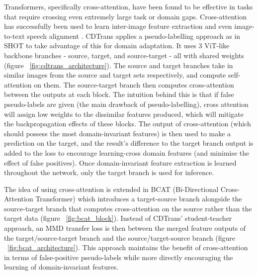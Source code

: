 \documentclass[a4paper,12pt]{report}
\begin{document}
    Transformers, specifically cross-attention, have been found to be effective in tasks that require crossing even extremely large task or domain gaps. Cross-attention has successfully been used to learn inter-image feature extraction \cite{li_trear_2021}  and even image-to-text speech alignment \cite{tsai_multimodal_2019}. CDTrans \cite{xu_cdtrans_2021} applies a pseudo-labelling approach as in SHOT \cite{liang_we_2021} to take advantage of this for domain adaptation. It uses 3 ViT-like backbone branches - source, target, and source-target - all with shared weights (figure ~\ref{fig:cdtrans_architecture}). The source and target branches take in similar images from the source and target sets respectively, and compute self-attention on them. The source-target branch then computes cross-attention between the outputs at each block. The intuition behind this is that if false pseudo-labels are given (the main drawback of pseudo-labelling), cross attention will assign low weights to the dissimilar features produced, which will mitigate the backpropagation effects of these blocks. The output of cross-attention (which should possess the most domain-invariant features) is then used to make a prediction on the target, and the result’s difference to the target branch output is added to the loss to encourage learning-cross domain features (and minimise the effect of false positives). Once domain-invariant feature extraction is learned throughout the network, only the target branch is used for inference.

    The idea of using cross-attention is extended in BCAT (Bi-Directional Cross-Attention Transformer) \cite{wang_domain_2022} which introduces a target-source branch alongside the source-target branch that computes cross-attention on the source rather than the target data (figure ~\ref{fig:bcat_block}). Instead of CDTrans’ student-teacher approach, an MMD transfer loss is then between the merged feature outputs of the target/source-target branch and the source/target-source branch (figure ~\ref{fig:bcat_architecture}). This approach maintains the benefit of cross-attention in terms of false-positive pseudo-labels while more directly encouraging the learning of domain-invariant features.
    
\end{document}

